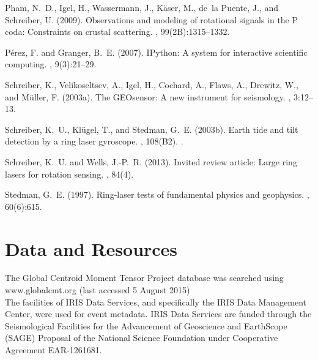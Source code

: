 \documentclass[12pt,reqno,letter]{article}
\begin{document}
\begin{thebibliography}{}
Pham, N.~D., Igel, H., Wassermann, J., Käser, M., de~la Puente, J., and
  Schreiber, U. (2009).
\newblock Observations and modeling of rotational signals in the {P} coda:
  Constraints on crustal scattering.
,
  99(2B):1315--1332.

Pérez, F. and Granger, B.~E. (2007).
\newblock I{P}ython: A system for interactive scientific computing.
, 9(3):21--29.

Schreiber, K., Velikoseltsev, A., Igel, H., Cochard, A., Flaws, A., Drewitz,
  W., and M{\"u}ller, F. (2003a).
\newblock The {GEO}sensor: A new instrument for seismology.
, 3:12--13.

Schreiber, K.~U., Klügel, T., and Stedman, G.~E. (2003b).
\newblock Earth tide and tilt detection by a ring laser gyroscope.
, 108(B2).
.

Schreiber, K.~U. and Wells, J.-P.~R. (2013).
\newblock Invited review article: Large ring lasers for rotation sensing.
, 84(4).

Stedman, G.~E. (1997).
\newblock Ring-laser tests of fundamental physics and geophysics.
, 60(6):615.

\end{thebibliography}


\newpage

\section*{Data and Resources}
The Global Centroid Moment Tensor Project database was searched using www.globalcmt.org (last accessed 5 August 2015)\\

\noindent
The facilities of IRIS Data Services, and specifically the IRIS Data Management Center, were used for event metadata. IRIS Data Services are funded through the Seismological Facilities for the Advancement of Geoscience and EarthScope (SAGE) Proposal of the National Science Foundation under Cooperative Agreement EAR-1261681.
\end{document}
